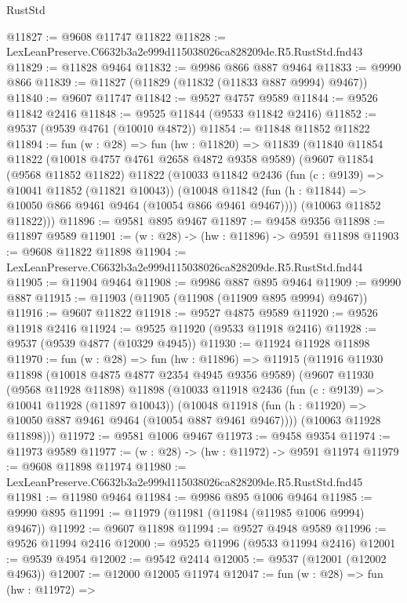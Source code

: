 \begin{lexlean}{RustStd}
\begin{coremodule}
@11827 := @9608 @11747 @11822
@11828 := LexLeanPreserve.C6632b3a2e999d115038026ca828209de.R5.RustStd.fnd43
@11829 := @11828 @9464
@11832 := @9986 @866 @887 @9464
@11833 := @9990 @866
@11839 := @11827 (@11829 (@11832 (@11833 @887 @9994) @9467))
@11840 := @9607 @11747
@11842 := @9527 @4757 @9589
@11844 := @9526 @11842 @2416
@11848 := @9525 @11844 (@9533 @11842 @2416)
@11852 := @9537 (@9539 @4761 (@10010 @4872))
@11854 := @11848 @11852 @11822
@11894 := fun (w : @28) =>
  fun (hw : @11820) =>
  @11839
    (@11840
      @11854
      @11822
      (@10018 @4757 @4761 @2658 @4872 @9358 @9589)
      (@9607
        @11854
        (@9568 @11852 @11822)
        @11822
        (@10033
          @11842
          @2436
          (fun (c : @9139) => @10041 @11852 (@11821 @10043))
          (@10048 @11842 (fun (h : @11844) => @10050 @866 @9461 @9464 (@10054 @866 @9461 @9467))))
        (@10063 @11852 @11822)))
@11896 := @9581 @895 @9467
@11897 := @9458 @9356
@11898 := @11897 @9589
@11901 := (w : @28) -> (hw : @11896) -> @9591 @11898
@11903 := @9608 @11822 @11898
@11904 := LexLeanPreserve.C6632b3a2e999d115038026ca828209de.R5.RustStd.fnd44
@11905 := @11904 @9464
@11908 := @9986 @887 @895 @9464
@11909 := @9990 @887
@11915 := @11903 (@11905 (@11908 (@11909 @895 @9994) @9467))
@11916 := @9607 @11822
@11918 := @9527 @4875 @9589
@11920 := @9526 @11918 @2416
@11924 := @9525 @11920 (@9533 @11918 @2416)
@11928 := @9537 (@9539 @4877 (@10329 @4945))
@11930 := @11924 @11928 @11898
@11970 := fun (w : @28) =>
  fun (hw : @11896) =>
  @11915
    (@11916
      @11930
      @11898
      (@10018 @4875 @4877 @2354 @4945 @9356 @9589)
      (@9607
        @11930
        (@9568 @11928 @11898)
        @11898
        (@10033
          @11918
          @2436
          (fun (c : @9139) => @10041 @11928 (@11897 @10043))
          (@10048 @11918 (fun (h : @11920) => @10050 @887 @9461 @9464 (@10054 @887 @9461 @9467))))
        (@10063 @11928 @11898)))
@11972 := @9581 @1006 @9467
@11973 := @9458 @9354
@11974 := @11973 @9589
@11977 := (w : @28) -> (hw : @11972) -> @9591 @11974
@11979 := @9608 @11898 @11974
@11980 := LexLeanPreserve.C6632b3a2e999d115038026ca828209de.R5.RustStd.fnd45
@11981 := @11980 @9464
@11984 := @9986 @895 @1006 @9464
@11985 := @9990 @895
@11991 := @11979 (@11981 (@11984 (@11985 @1006 @9994) @9467))
@11992 := @9607 @11898
@11994 := @9527 @4948 @9589
@11996 := @9526 @11994 @2416
@12000 := @9525 @11996 (@9533 @11994 @2416)
@12001 := @9539 @4954
@12002 := @9542 @2414
@12005 := @9537 (@12001 (@12002 @4963))
@12007 := @12000 @12005 @11974
@12047 := fun (w : @28) =>
  fun (hw : @11972) =>

\end{coremodule}
\end{lexlean}
